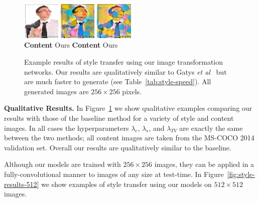 \documentclass[runningheads]{llncs}
\newcommand{\etal}{\textit{et al}}
\begin{document}
\begin{figure}
  \includegraphics[width=0.16\textwidth]{418_orig.jpg}
  \includegraphics[width=0.16\textwidth]{418_simpsons_baseline.jpg}
  \includegraphics[width=0.16\textwidth]{418_simpsons_mine.jpg} \\
  \hspace*{2.5mm} \textbf{Content}
  \hspace{9mm} \cite{gatys2015neural}
  \hspace{12mm} Ours
  \hspace{9.5mm} \textbf{Content}
  \hspace{9mm} \cite{gatys2015neural}
  \hspace{12mm} Ours \\
  \vspace{-5mm}
  \caption{Example results of style transfer using our image transformation networks.
    Our results are qualitatively similar to Gatys \etal~\cite{gatys2015neural}
    but are much faster to generate (see Table~\ref{tab:style-speed}).
    All generated images are $256\times256$ pixels.
  }
  \label{fig:style-results}
\end{figure}


\vspace{1mm}
\noindent \textbf{Qualitative Results.}
In Figure~\ref{fig:style-results} we show qualitative examples comparing our results with those
of the baseline method for a variety of style and content images. In all cases the hyperparameters
$\lambda_c$, $\lambda_s$, and $\lambda_{TV}$ are exactly the same between the two methods; all
content images are taken from the MS-COCO 2014 validation set. Overall our results
are qualitatively similar to the baseline.

Although our models are trained with $256\times256$ images, they can be applied in a fully-convolutional
manner to images of any size at test-time. In Figure~\ref{fig:style-results-512} we show examples
of style transfer using our models on $512\times512$ images.
\end{document}
